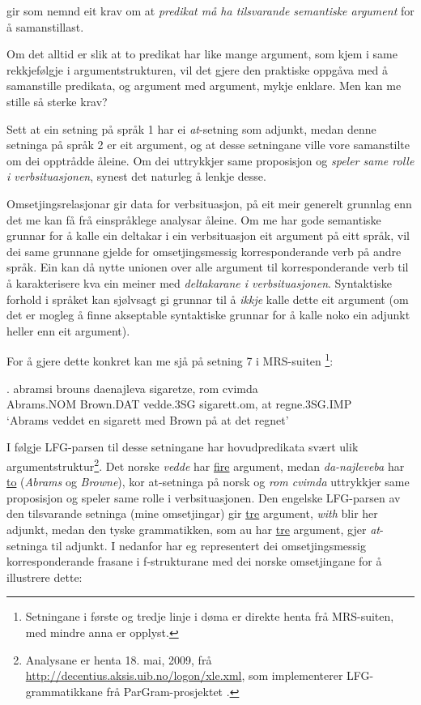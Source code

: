 \documentclass[11pt,a4paper,oneside,draft]{book}
\begin{document}
\label{SEC:lik-argstr}

\citet{thunes2003eal} gir som nemnd eit krav om at \emph{predikat må ha tilsvarande semantiske argument} for å samanstillast.

Om det alltid er slik at to predikat har like mange argument, som kjem i
same rekkjefølgje i argumentstrukturen, vil det gjere den praktiske
oppgåva med å samanstille predikata, og argument med argument, mykje
enklare. Men kan me stille så sterke krav?

Sett at ein setning på språk 1 har ei \emph{at}-setning som adjunkt, medan
denne setninga på språk 2 er eit argument, og at desse setningane
ville vore samanstilte om dei opptrådde åleine. Om dei uttrykkjer same
proposisjon og \emph{speler same rolle i verbsituasjonen},
synest det naturleg å lenkje desse.  

Omsetjingsrelasjonar gir data for verbsituasjon, på eit meir generelt
grunnlag enn det me kan få frå einspråklege analysar åleine. Om me har
gode semantiske grunnar for å kalle ein deltakar i ein verbsituasjon
eit argument på eitt språk, vil dei same grunnane gjelde for
omsetjingsmessig korresponderande verb på andre språk. Ein kan då
nytte unionen over alle argument til korresponderande verb til å
karakterisere kva ein meiner med \emph{deltakarane i verbsituasjonen}. Syntaktiske forhold i språket kan sjølvsagt gi
grunnar til å \emph{ikkje} kalle dette eit argument (om det er mogleg å
finne akseptable syntaktiske grunnar for å kalle noko ein adjunkt
heller enn eit argument).
 
For å gjere dette konkret kan me sjå på setning 7 i MRS-suiten
\citep{mrs-suite}\footnote{Setningane i første og tredje linje i døma er direkte henta frå
MRS-suiten, med mindre anna er opplyst. }:

\exg.  abramsi brouns       daenajleva sigaretze, rom cvimda \\
      Abrams.NOM Brown.DAT vedde.3SG sigarett.om, at  regne.3SG.IMP \\
     `Abrams veddet en sigarett med Brown på at det regnet' 

I følgje LFG-parsen til desse setningane har hovudpredikata svært ulik
argumentstruktur\footnote{Analysane er henta 18. mai, 2009, frå
        \href{http://decentius.aksis.uib.no/logon/xle.xml}{http://decentius.aksis.uib.no/logon/xle.xml}, som implementerer
        LFG-grammatikkane frå ParGram-prosjektet \citep{butt2002pgp}. }. Det norske \emph{vedde} har \underline{fire} argument, medan
\emph{da-najleveba} har \underline{to} (\emph{Abrams} og \emph{Browne}), kor at-setninga på
norsk og \emph{rom cvimda} uttrykkjer same proposisjon og speler same rolle
i verbsituasjonen. Den engelske LFG-parsen av den tilsvarande setninga
(mine omsetjingar) gir \underline{tre} argument, \emph{with} blir her adjunkt, medan
den tyske grammatikken, som au har \underline{tre} argument, gjer \emph{at}-setninga
til adjunkt. I \Next nedanfor har eg representert dei omsetjingsmessig
korresponderande frasane i f-strukturane med dei norske omsetjingane
for å illustrere dette:
\end{document}
